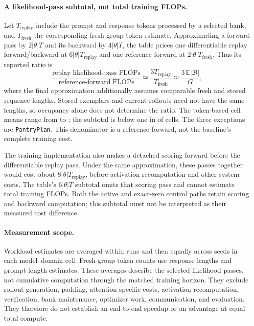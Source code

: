 \documentclass{article}
\newcommand{\1}{\mathbf 1}
\newcommand{\E}{\mathbb E}
\theoremstyle{remark}
\theoremstyle{definition}
\theoremstyle{plain}
\begin{document}
\paragraph{A likelihood-pass subtotal, not total training FLOPs.}
Let $T_{\mathrm{replay}}$ include the prompt and response tokens processed
by a selected bank, and $T_{\mathrm{fresh}}$ the corresponding fresh-group
token estimate. Approximating a forward pass by $2|\theta|T$ and its backward
by $4|\theta|T$, the table prices one differentiable replay forward/backward
at $6|\theta|T_{\mathrm{replay}}$ and one reference forward at
$2|\theta|T_{\mathrm{fresh}}$. Thus its reported ratio is
\begin{equation}
  \frac{\text{replay likelihood-pass FLOPs}}{\text{reference-forward FLOPs}}
  \simeq \frac{3T_{\mathrm{replay}}}{T_{\mathrm{fresh}}}
  \approx \frac{3\,\E|\mathcal B|}{G},
  \label{eq:replay-flop-ratio}
\end{equation}
where the final approximation additionally assumes comparable fresh and
stored sequence lengths. Stored exemplars and current rollouts need not have
the same lengths, so occupancy alone does not determine the ratio. The
token-based cell means range from \MDcostRatioMin{} to \MDcostRatioMax{};
the subtotal is below one in \MDcostCellsBelow{} of \MDcostCellsTotal{} cells.
The three exceptions are \texttt{PantryPlan}. This denominator is a reference
forward, not the baseline's complete training cost.

The training implementation also makes a detached scoring forward before
the differentiable replay pass. Under the same approximation, these passes
together would cost about $8|\theta|T_{\mathrm{replay}}$, before activation
recomputation and other system costs. The table's $6|\theta|T$ subtotal omits
that scoring pass and cannot estimate total training FLOPs. Both the
active and exact-zero control paths retain scoring and backward computation;
this subtotal must not be interpreted as their measured cost difference.

\paragraph{Measurement scope.}
Workload estimates are averaged within runs and then equally across seeds
in each model--domain cell. Fresh-group token counts use response lengths
and prompt-length estimates. These averages describe the selected likelihood
passes, not cumulative computation through the matched training horizon.
They exclude rollout generation, padding, attention-specific costs,
activation recomputation, verification, bank maintenance, optimizer work,
communication, and evaluation. They therefore do not establish an
end-to-end speedup or an advantage at equal total compute.
\end{document}
